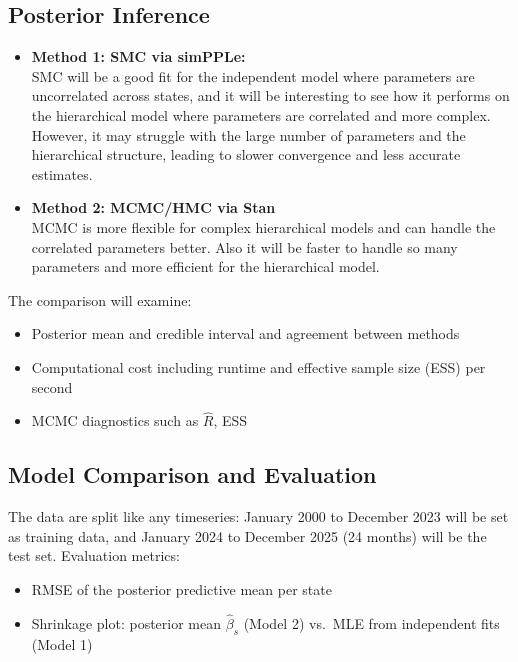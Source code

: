 \documentclass[11pt]{article}
\begin{document}
\subsection{Posterior Inference}

\begin{itemize}
  \item \textbf{Method 1: SMC via simPPLe:} \\
        SMC will be a good fit for the independent model where parameters are uncorrelated across states,
        and it will be interesting to see how it performs on the hierarchical model where parameters are correlated and more complex.
        However, it may struggle with the large number of parameters and the hierarchical structure, leading to slower convergence and less accurate estimates. 
  \item \textbf{Method 2: MCMC/HMC via Stan} \\
        MCMC is more flexible for complex hierarchical models and can handle the correlated parameters better. 
        Also it will be faster to handle so many parameters and more efficient for the hierarchical model.
\end{itemize}

The comparison will examine:
\begin{itemize}
  \item Posterior mean and credible interval and agreement between methods
  \item Computational cost including runtime and effective sample size (ESS) per second
  \item MCMC diagnostics such as $\hat{R}$, ESS
\end{itemize} 


\subsection{Model Comparison and Evaluation}

The data are split like any timeseries: January 2000 to December 2023 will be set as training data, and
January 2024 to December 2025 (24 months) will be the test set.
Evaluation metrics:
\begin{itemize}[noitemsep]
  \item  RMSE of the posterior predictive mean per state
  \item Shrinkage plot: posterior mean $\hat{\beta}_s$ (Model 2) vs.\ MLE
        from independent fits (Model 1)
\end{itemize}
\end{document}

